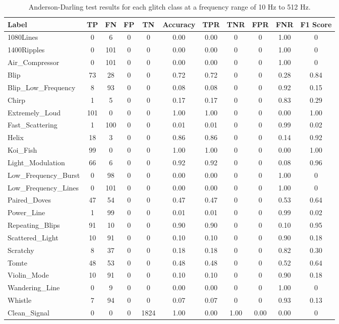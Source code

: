 \documentclass[12pt]{article}
\begin{document}
\begin{table}[H]
  \begin{tabular}{lcccccccccc}
  \toprule
  Label & TP & FN & FP & TN & Accuracy & TPR & TNR & FPR & FNR & F1 Score \\
  \midrule
  1080Lines & 0 & 6 & 0 & 0 & 0.00 & 0.00 & 0 & 0 & 1.00 & 0 \\
  1400Ripples & 0 & 101 & 0 & 0 & 0.00 & 0.00 & 0 & 0 & 1.00 & 0 \\
  Air\_Compressor & 0 & 101 & 0 & 0 & 0.00 & 0.00 & 0 & 0 & 1.00 & 0 \\
  Blip & 73 & 28 & 0 & 0 & 0.72 & 0.72 & 0 & 0 & 0.28 & 0.84 \\
  Blip\_Low\_Frequency & 8 & 93 & 0 & 0 & 0.08 & 0.08 & 0 & 0 & 0.92 & 0.15 \\
  Chirp & 1 & 5 & 0 & 0 & 0.17 & 0.17 & 0 & 0 & 0.83 & 0.29 \\
  Extremely\_Loud & 101 & 0 & 0 & 0 & 1.00 & 1.00 & 0 & 0 & 0.00 & 1.00 \\
  Fast\_Scattering & 1 & 100 & 0 & 0 & 0.01 & 0.01 & 0 & 0 & 0.99 & 0.02 \\
  Helix & 18 & 3 & 0 & 0 & 0.86 & 0.86 & 0 & 0 & 0.14 & 0.92 \\
  Koi\_Fish & 99 & 0 & 0 & 0 & 1.00 & 1.00 & 0 & 0 & 0.00 & 1.00 \\
  Light\_Modulation & 66 & 6 & 0 & 0 & 0.92 & 0.92 & 0 & 0 & 0.08 & 0.96 \\
  Low\_Frequency\_Burst & 0 & 98 & 0 & 0 & 0.00 & 0.00 & 0 & 0 & 1.00 & 0 \\
  Low\_Frequency\_Lines & 0 & 101 & 0 & 0 & 0.00 & 0.00 & 0 & 0 & 1.00 & 0 \\
  Paired\_Doves & 47 & 54 & 0 & 0 & 0.47 & 0.47 & 0 & 0 & 0.53 & 0.64 \\
  Power\_Line & 1 & 99 & 0 & 0 & 0.01 & 0.01 & 0 & 0 & 0.99 & 0.02 \\
  Repeating\_Blips & 91 & 10 & 0 & 0 & 0.90 & 0.90 & 0 & 0 & 0.10 & 0.95 \\
  Scattered\_Light & 10 & 91 & 0 & 0 & 0.10 & 0.10 & 0 & 0 & 0.90 & 0.18 \\
  Scratchy & 8 & 37 & 0 & 0 & 0.18 & 0.18 & 0 & 0 & 0.82 & 0.30 \\
  Tomte & 48 & 53 & 0 & 0 & 0.48 & 0.48 & 0 & 0 & 0.52 & 0.64 \\
  Violin\_Mode & 10 & 91 & 0 & 0 & 0.10 & 0.10 & 0 & 0 & 0.90 & 0.18 \\
  Wandering\_Line & 0 & 9 & 0 & 0 & 0.00 & 0.00 & 0 & 0 & 1.00 & 0 \\
  Whistle & 7 & 94 & 0 & 0 & 0.07 & 0.07 & 0 & 0 & 0.93 & 0.13 \\
  Clean\_Signal & 0 & 0 & 0 & 1824 & 1.00 & 0.00 & 1.00 & 0.00 & 0.00 & 0 \\
  \bottomrule
  \end{tabular}
  \caption{Anderson-Darling test results for each glitch class at a frequency range of 10 Hz to 512 Hz.}
  \label{tab:ad_low_frequency_results}
\end{table}
\end{document}
